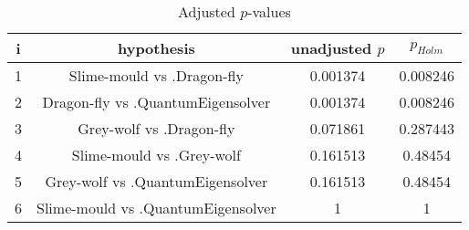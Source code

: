 \documentclass[a4paper,10pt]{article}
\begin{document}
\begin{landscape}
\begin{table}[!htp]
\centering\scriptsize
\begin{tabular}{cccc}
i&hypothesis&unadjusted $p$&$p_{Holm}$\\
\hline1&Slime-mould vs .Dragon-fly&0.001374&0.008246\\
2&Dragon-fly vs .QuantumEigensolver&0.001374&0.008246\\
3&Grey-wolf vs .Dragon-fly&0.071861&0.287443\\
4&Slime-mould vs .Grey-wolf&0.161513&0.48454\\
5&Grey-wolf vs .QuantumEigensolver&0.161513&0.48454\\
6&Slime-mould vs .QuantumEigensolver&1&1\\
\hline
\end{tabular}
\caption{Adjusted $p$-values}
\end{table}

\end{landscape}
\end{document}
